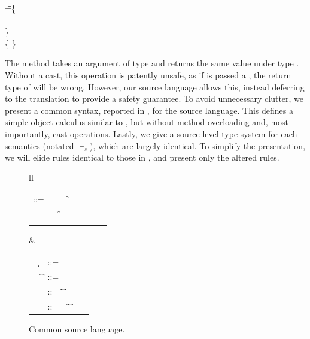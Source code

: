 \documentclass[runnningheads]{tex/llncs}
\begin{document}
\begin{tabbing}
\hspace{1cm}\K\HS \Call{\New\C{}}\m{\New\D{}} \HS\HS\HS\WHERE\HS
  \K\HS =\HS \= \class\= \C \{\\
       \> \HS \Mdef\m\x\any\C{\HS\x\HS}\\
       \> \}  \\
       \>\class \D \{ \}
\end{tabbing}         

\noindent The method \m takes an argument of type \any and returns the same
value under type \C. Without a cast, this operation is patently unsafe, as
if \m is passed a \D, the return type of \m will be wrong. However, our
source language allows this, instead deferring to the translation to provide
a safety guarantee.  To avoid unnecessary clutter, we present a common
syntax, reported in , for the source language. This
defines a simple object calculus similar to \kafka, but without method
overloading and, most importantly, cast operations. Lastly, we give a
source-level type system for each semantics (notated $\vdash_{\!s}$), which
are largely identical. To simplify the presentation, we will elide rules
identical to those in \kafka, and present only the altered rules.

\begin{figure}[!h]\hrulefill
	
	\begin{tabular}{ll}
		\begin{minipage}{6cm}\begin{tabular}{@{}l@{~}l@{}l@{}l@{}l@{}l@{}l@{}l}
				\e\hspace{.1cm} ::= & \hspace{.2cm} \x        
				&\B \this         
				&\B \FRead\f \\    
				&
				&\B \FWrite\f\e
				&\B \Call\e\m\e \\
				& 
				&\B \that      
				&\B \New\C{\e[1]..}  
		\end{tabular}\end{minipage}&
		\begin{minipage}{5cm}\begin{tabular}{l@{~}l@{}l@{}l}
				~ \k &::= \Class \C {\fd[1]..}{\md[1]..} \\
				~ \t&::= ~ \any  \B   \C  \\ 
				\md &::= \Mdef\m\x\t\t\e \\
				~\fd&::= ~ \Fdef\f\t \\ 
		\end{tabular}\end{minipage} 
	\end{tabular}
	\vspace{2mm} 

\hrulefill

        \caption{Common source language.}\label{f:sourcesyntax}
\end{figure}
\end{document}
